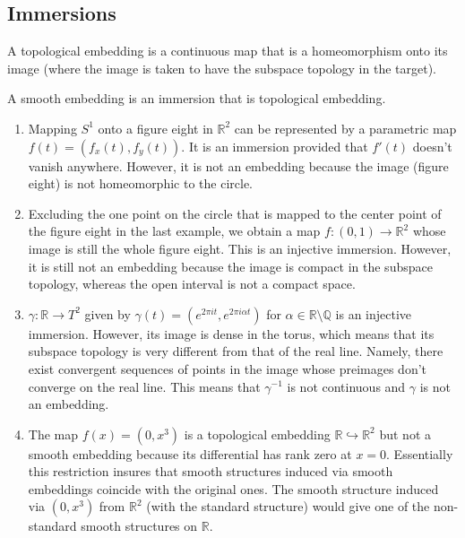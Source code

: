 \documentclass[english,letterpaper]{article}%
\numberwithin{equation}{section}
\numberwithin{figure}{section}
\numberwithin{table}{section}
\theoremstyle{definition}
\theoremstyle{definition}
\theoremstyle{definition}
\theoremstyle{plain}
\theoremstyle{plain}
\theoremstyle{plain}
\theoremstyle{plain}
\theoremstyle{remark}
\theoremstyle{remark}
\begin{document}
\subsection{Immersions}


\begin{defn}
A topological embedding is a continuous map that is a homeomorphism onto its image (where the image is taken to have the subspace topology in the target).
\end{defn}

\begin{defn}
A smooth embedding is an immersion that is topological embedding.
\end{defn}

\begin{example}
\begin{enumerate}
    \item Mapping $S^1$ onto a figure eight in $\mathbb{R}^2$ can be represented by a parametric map $f(t)=(f_x(t),f_y(t))$. It is an immersion provided that $f'(t)$ doesn't vanish anywhere. However, it is not an embedding because the image (figure eight) is not homeomorphic to the circle.
    \item Excluding the one point on the circle that is mapped to the center point of the figure eight in the last example, we obtain a map $f:(0,1)\to \mathbb{R}^2$ whose image is still the whole figure eight. This is an injective immersion. However, it is still not an embedding because the image is compact in the subspace topology, whereas the open interval is not a compact space.
    \item $\gamma:\mathbb{R}\to T^2$ given by $\gamma(t)=(e^{2\pi it},e^{2\pi i\alpha t})$ for $\alpha\in\mathbb{R}\setminus\mathbb{Q}$ is an injective immersion. However, its image is dense in the torus, which means that its subspace topology is very different from that of the real line. Namely, there exist convergent sequences of points in the image whose preimages don't converge on the real line. This means that $\gamma^{-1}$ is not continuous and $\gamma$ is not an embedding.
    \item The map $f(x)=(0,x^3)$ is a topological embedding $\mathbb{R}\hookrightarrow\mathbb{R}^2$ but not a smooth embedding because its differential has rank zero at $x=0$. Essentially this restriction insures that smooth structures induced via smooth embeddings coincide with the original ones. The smooth structure induced via $(0,x^3)$ from $\mathbb{R}^2$ (with the standard structure) would give one of the non-standard smooth structures on $\mathbb{R}$.
\end{enumerate}
\end{example}
\end{document}
